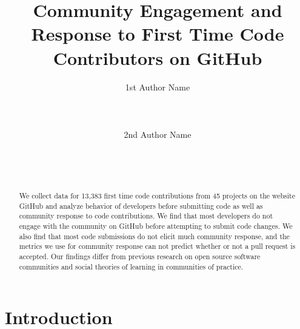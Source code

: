 \documentclass{sigchi}
\begin{document}
\title{Community Engagement and Response to First Time Code Contributors on GitHub}

\author{
  \alignauthor 1st Author Name\\
    \\
    \\
    \\
  \alignauthor 2nd Author Name\\
    \\
    \\
    \\
}

\maketitle                %



\begin{abstract}           %
We collect data for 13,383 first time code contributions from 45 projects on the
website GitHub and analyze behavior of developers before submitting code as well
as community response to code contributions. We find that most developers do not
engage with the community on GitHub before attempting to submit code changes. We
also find that most code submissions do not elicit much community response, and
the metrics we use for community response can not predict whether or not a pull
request is accepted. Our findings differ from previous research on open source
software communities and social theories of learning in communities of practice.
\end{abstract}

\section{Introduction}
\end{document}

